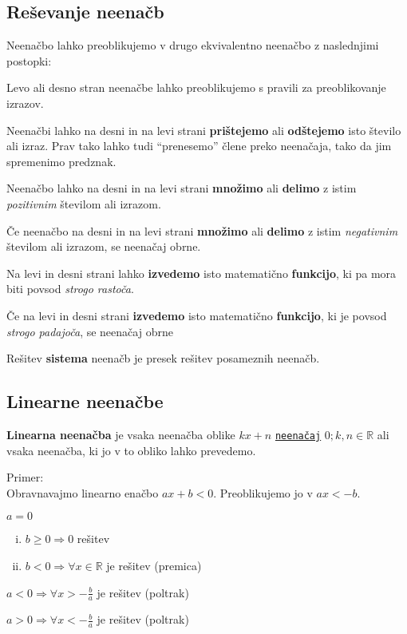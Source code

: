 \documentclass[a4paper,oneside,12pt,fleqn]{article}
\def\R{\ensuremath{\mathbb R}}
\renewcommand\implies\Rightarrow
\numberwithin{equation}{section}
\newenvironment{itemize*}%
{
\vspace{-12pt}%
\begin{itemize}%
\setlength{\itemsep}{0pt}%
\setlength{\parskip}{2pt}}%
{\end{itemize}}
\newenvironment{enumerate*}%
{
\vspace{-12pt}%
\begin{enumerate}%
\setlength{\itemsep}{0pt}%
\setlength{\parskip}{2pt}}%
{\end{enumerate}}
\begin{document}
\subsection{Reševanje neenačb}
\label{sec:neenac:resev}
Neenačbo lahko preoblikujemo v drugo ekvivalentno neenačbo z naslednjimi postopki:
\begin{itemize*}
  \item Levo ali desno stran neenačbe lahko preoblikujemo s pravili za preoblikovanje
    izrazov.
  \item Neenačbi lahko na desni in na levi strani \textbf{prištejemo} ali \textbf{odštejemo} isto število ali izraz.
Prav tako lahko tudi ``prenesemo'' člene preko neenačaja, tako da jim spremenimo predznak.

  \item Neenačbo lahko na desni in na levi strani \textbf{množimo} ali \textbf{delimo} z istim \textit{pozitivnim} številom
ali izrazom.

  \item Če neenačbo na desni in na levi strani \textbf{množimo} ali \textbf{delimo} z istim \textit{negativnim} številom
ali izrazom, se neenačaj obrne.

  \item Na levi in desni strani lahko \textbf{izvedemo} isto matematično \textbf{funkcijo}, ki pa mora biti povsod
\textit{strogo rastoča}.

  \item Če na levi in desni strani \textbf{izvedemo} isto matematično \textbf{funkcijo}, ki je povsod \textit{strogo
padajoča}, se neenačaj obrne
\end{itemize*}

Rešitev \textbf{sistema} neenačb je presek rešitev posameznih neenačb.

\subsection{Linearne neenačbe}
\label{sec:neenac:lin}
\textbf{Linearna neenačba} je vsaka neenačba oblike $kx + n$
\hyperlink{point:neenacaj}{\texttt{neenačaj}} $0; k, n \in \R$ ali vsaka
neenačba, ki jo v to obliko lahko prevedemo.

Primer:\\
Obravnavajmo linearno enačbo $ax+b<0$.
Preoblikujemo jo v $ax<-b$.
\begin{enumerate*}
  \item $a = 0$
    \begin{enumerate}[i.]
      \item $b \ge 0 \implies 0$ rešitev
      \item $b < 0 \implies \forall x \in \R$ je rešitev (premica)
    \end{enumerate}
  \item $a < 0 \implies \forall x > -\frac{b}{a}$ je rešitev (poltrak)
  \item $a > 0 \implies \forall x < -\frac{b}{a}$ je rešitev (poltrak)
\end{enumerate*}
\end{document}
